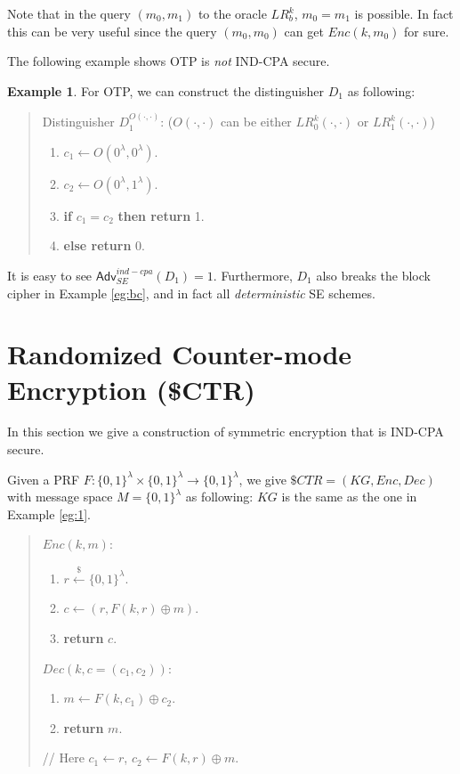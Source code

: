 \documentclass[12pt]{article}
\newcommand{\bits}{\{0,1\}}
\newcommand{\getsr}{\stackrel{\$}{\gets}}
\newcommand{\Adv}{\mathsf{Adv}}
\theoremstyle{definition}
\newtheorem{example}[theorem]{Example}
\begin{document}
Note that in the query $(m_0, m_1)$ to the oracle $LR_b^k$, $m_0 = m_1$ is possible. In fact this can be very useful since the query $(m_0, m_0)$ can get $Enc(k, m_0)$ for sure.

The following example shows OTP is \emph{not} IND-CPA secure.
\begin{example}
For OTP, we can construct the distinguisher $D_1$ as following:
\begin{quote}
Distinguisher $D_1^{O(\cdot, \cdot)}$: ($O(\cdot, \cdot)$ can be either $LR_0^k(\cdot, \cdot)$ or $LR_1^k(\cdot, \cdot)$)
\begin{enumerate}
\item $c_1 \gets O(0^\lambda, 0^\lambda)$.
\item $c_2 \gets O(0^\lambda, 1^\lambda)$.
\item {\bf if} $c_1 = c_2$ {\bf then return} 1.
\item {\bf else return} 0.
\end{enumerate}
\end{quote}
It is easy to see $\Adv_{SE}^{ind-cpa}(D_1) = 1$. Furthermore, $D_1$ also breaks the block cipher in Example \ref{eg:bc}, and in fact all \emph{deterministic} SE schemes.
\end{example}

\section{Randomized Counter-mode Encryption (\$CTR)}
In this section we give a construction of symmetric encryption that is IND-CPA secure. 

Given a PRF $F : \bits^\lambda \times \bits^\lambda \to \bits^\lambda$, we give $\$CTR = (KG, Enc, Dec)$ with message space $M=\bits^\lambda$ as following:
$KG$ is the same as the one in Example \ref{eg:1}.
\begin{quote}
\begin{minipage}{.4\textwidth}
$Enc(k, m)$:
\begin{enumerate}
\item $r \getsr \bits^\lambda$.
\item $c \gets (r, F(k,r) \oplus m)$.
\item {\bf return} $c$.
\end{enumerate}
\end{minipage}
\hspace{.1in}
\begin{minipage}{.4\textwidth}
$Dec(k, c=(c_1, c_2))$:
\begin{enumerate}
\item $m \gets F(k, c_1) \oplus c_2$.
\item {\bf return} $m$.
\end{enumerate}
// Here $c_1 \gets r$, $c_2 \gets F(k,r) \oplus m$.
\end{minipage}
\end{quote}
\end{document}
